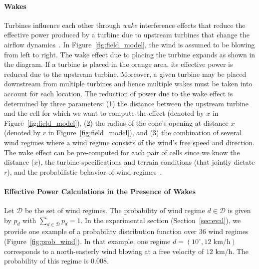 \documentclass[preprint,12pt]{elsarticle}
\begin{document}
\paragraph{Wakes}
Turbines influence each other through \emph{wake} interference effects that reduce the effective power produced by a turbine due to upstream turbines that change the airflow dynamics~\cite{jensen1983note,shakoor2016wake}.
 In
Figure~\ref{fig:field_model}, the wind is assumed to be
blowing from left to right. The wake effect due to placing the turbine
expands as shown in the diagram.
If a turbine is placed in the orange area, its effective power is
reduced due to the upstream turbine.
Moreover, a given turbine may be placed downstream from multiple turbines and hence
multiple wakes must be taken into account for each location.  The
reduction of power due to the wake effect is determined by three
parameters: (1) the distance between the upstream turbine and the cell
for which we want to compute the effect (denoted by $x$ in
Figure~\ref{fig:field_model}), (2) the radius of the cone's opening at distance $x$ 
(denoted by $r$ in Figure~\ref{fig:field_model}), and (3) the
combination of several wind regimes where a wind regime consists of 
the wind's free speed and direction.  The wake effect can be pre-computed
for each pair of cells since we know the distance ($x$), the turbine
specifications and terrain conditions (that jointly dictate $r$), and the
probabilistic behavior of wind regimes~\cite{Zhang2014}.
	 
\paragraph{Effective Power Calculations in the Presence of Wakes} 
Let $\mathcal{D}$ be the set of wind regimes.
The probability of wind regime 
$d \in \mathcal{D}$ is given by $p_d$ with $\sum_{d \in \mathcal{D}}^{} p_d = 1$. In the experimental section (Section~\ref{sec:eval}),
we provide one example of a probability distribution 
function over $36$ wind regimes (Figure~\ref{fig:prob_wind}). In that example, 
one regime $d=(10^\circ, 12 \mbox{ km/h})$ corresponds to a north-easterly wind blowing at a free velocity of $12\mbox{ km/h}$. The
probability of this regime is $0.008$.
\end{document}
